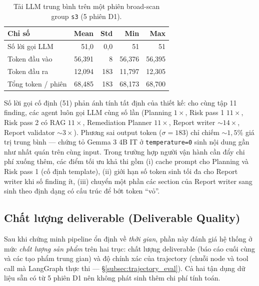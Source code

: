 \begin{table}[!htb]
  \centering
  \caption{Tải LLM trung bình trên một phiên broad-scan group \texttt{s3} (5 phiên D1).}
  \label{tab:perf_llm_load}
  \small
  \begin{tabular}{lrrrr}
    \toprule
    \textbf{Chỉ số} & \textbf{Mean} & \textbf{Std} & \textbf{Min} & \textbf{Max} \\
    \midrule
    Số lời gọi LLM                       & 51{,}0  & 0{,}0   & 51    & 51    \\
    Token đầu vào                         & 56{,}391 & 8       & 56{,}376 & 56{,}395 \\
    Token đầu ra                          & 12{,}094 & 183     & 11{,}797 & 12{,}305 \\
    Tổng token / phiên                    & 68{,}485 & 183     & 68{,}173 & 68{,}700 \\
    \bottomrule
  \end{tabular}
\end{table}

Số lời gọi cố định (51) phản ánh tính tất định của thiết kế: cho cùng tập 11 finding, các agent luôn gọi LLM cùng số lần (Planning $1\times$, Risk pass 1 $11\times$, Risk pass 2 có RAG $11\times$, Remediation Planner $11\times$, Report writer $\sim 14\times$, Report validator $\sim 3\times$). Phương sai output token ($\sigma = 183$) chỉ chiếm $\sim 1{,}5\%$ giá trị trung bình --- chứng tỏ Gemma 3 4B IT ở \texttt{temperature=0} sinh nội dung gần như nhất quán trên cùng input. Trong trường hợp người vận hành cần đẩy chi phí xuống thêm, các điểm tối ưu khả thi gồm (i) cache prompt cho Planning và Risk pass 1 (cố định template), (ii) giới hạn số token sinh tối đa cho Report writer khi số finding ít, (iii) chuyển một phần các section của Report writer sang sinh theo định dạng có cấu trúc để bớt token ``vỏ''.

\subsection{Chất lượng deliverable (Deliverable Quality)}
\label{subsec:deliverable_quality}

Sau khi chứng minh pipeline ổn định về \emph{thời gian}, phần này đánh giá hệ thống ở mức \emph{chất lượng sản phẩm} trên hai trục: chất lượng deliverable (báo cáo cuối cùng và các tạo phẩm trung gian) và độ chính xác của trajectory (chuỗi node và tool call mà LangGraph thực thi --- \S\ref{subsec:trajectory_eval}). Cả hai tận dụng dữ liệu sẵn có từ 5 phiên D1 nên không phát sinh thêm chi phí tính toán.

